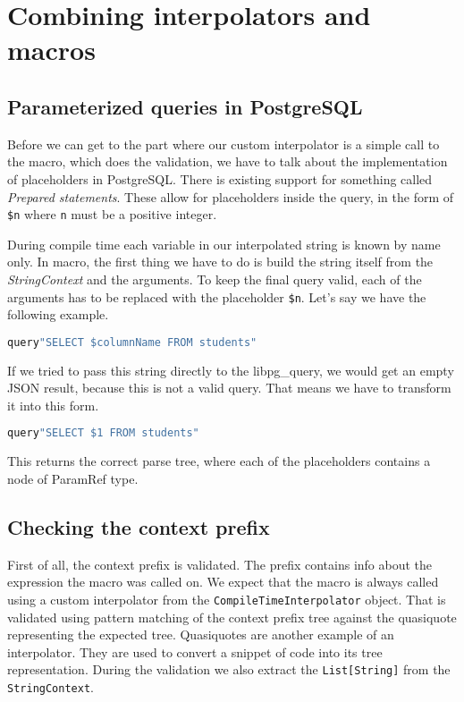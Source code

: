 \section{Combining interpolators and macros}
\subsection{Parameterized queries in PostgreSQL}
Before we can get to the part where our custom interpolator is a simple call to the macro, which does the validation, we have to talk about the implementation of placeholders in PostgreSQL. There is existing support for something called \textit{Prepared statements}. These allow for placeholders inside the query, in the form of \texttt{\$n} where \texttt{n} must be a positive integer.  

During compile time each variable in our interpolated string is known by name only. In macro, the first thing we have to do is build the string itself from the \textit{StringContext} and the arguments. To keep the final query valid, each of the arguments has to be replaced with the placeholder \texttt{\$n}. 
Let's say we have the following example.
\begin{lstlisting}[language=scala, basicstyle=\ttfamily, showstringspaces=false]
query"SELECT $columnName FROM students"
\end{lstlisting}
If we tried to pass this string directly to the libpg\_query, we would get an empty JSON result, because this is not a valid query. That means we have to transform it into this form.
\begin{lstlisting}[language=scala, basicstyle=\ttfamily, showstringspaces=false]
query"SELECT $1 FROM students"
\end{lstlisting}
This returns the correct parse tree, where each of the placeholders contains a node of ParamRef type. 

\subsection{Checking the context prefix}
First of all, the context prefix is validated. The prefix contains info about the expression the macro was called on. We expect that the macro is always called using a custom interpolator from the \texttt{CompileTimeInterpolator} object. That is validated using pattern matching of the context prefix tree against the quasiquote representing the expected tree. Quasiquotes are another example of an interpolator. They are used to convert a snippet of code into its tree representation.\cite{quasiquotes} During the validation we also extract the \texttt{List[String]} from the \texttt{StringContext}.

